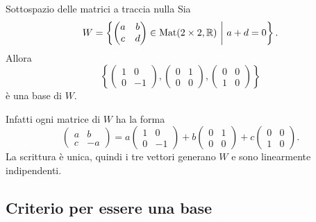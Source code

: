 \documentclass[a4paper]{article}
\begin{document}
\begin{snippetexample}{Sottospazio delle matrici a traccia nulla}
    Sia
    \[
        W=
        \left\{
            \begin{pmatrix}
                a & b\\
                c & d
            \end{pmatrix}
            \in\operatorname{Mat}(2\times 2,\mathbb{R})
            \ \middle|\
            a+d=0
        \right\}.
    \]
    Allora
    \[
        \left\{
            \begin{pmatrix}
                1 & 0\\
                0 & -1
            \end{pmatrix},
            \begin{pmatrix}
                0 & 1\\
                0 & 0
            \end{pmatrix},
            \begin{pmatrix}
                0 & 0\\
                1 & 0
            \end{pmatrix}
        \right\}
    \]
    è una base di \(W\).

    Infatti ogni matrice di \(W\) ha la forma
    \[
        \begin{pmatrix}
            a & b\\
            c & -a
        \end{pmatrix}
        =
        a
        \begin{pmatrix}
            1 & 0\\
            0 & -1
        \end{pmatrix}
        +
        b
        \begin{pmatrix}
            0 & 1\\
            0 & 0
        \end{pmatrix}
        +
        c
        \begin{pmatrix}
            0 & 0\\
            1 & 0
        \end{pmatrix}.
    \]
    La scrittura è unica, quindi i tre vettori generano \(W\) e sono linearmente indipendenti.
\end{snippetexample}

\subsection{Criterio per essere una base}
\end{document}
